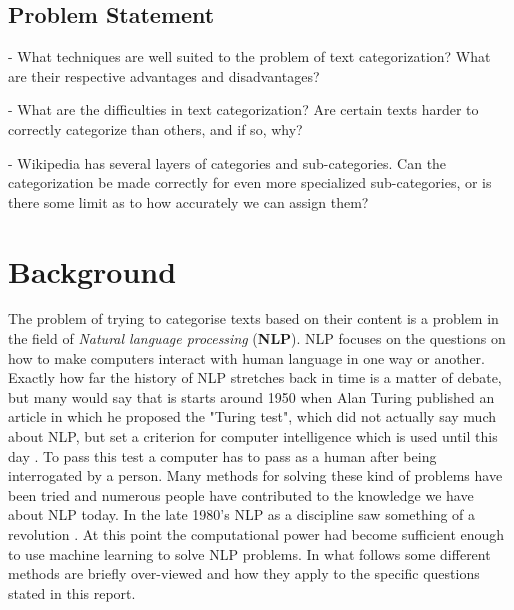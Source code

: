 \documentclass[a4paper]{article}
\begin{document}
\vspace{3mm}

\subsection{Problem Statement}

\vspace{3mm}

- What techniques are well suited to the problem of text categorization? What are their respective advantages and disadvantages?

\vspace{3mm}

- What are the difficulties in text categorization? Are certain texts harder to correctly categorize than others, and if so, why?

\vspace{3mm}

- Wikipedia has several layers of categories and sub-categories. Can the categorization be made correctly for even more specialized sub-categories, or is there some limit as to how accurately we can assign them?


\vspace{3mm}


\section{Background}

\vspace{3mm}

The problem of trying to categorise texts based on their content is a problem in the field of \textit{Natural language processing} (\textbf{NLP}). NLP focuses on the questions on how to make computers interact with human language in one way or another.\\

Exactly how far the history of NLP stretches back in time is a matter of debate, but many would say that is starts around 1950 when Alan Turing published an article in which he proposed the "Turing test", which did not actually say much about NLP, but set a criterion for computer intelligence which is used until this day \cite{AI}. To pass this test a computer has to pass as a human after being interrogated by a person. Many methods for solving these kind of problems have been tried and numerous people have contributed to the knowledge we have about NLP today. In the late 1980's NLP as a discipline saw something of a revolution \cite{historyNLP}. At this point the computational power had become sufficient enough to use machine learning to solve NLP problems. In what follows some different methods are briefly over-viewed and how they apply to the specific questions stated in this report.\\
\end{document}
